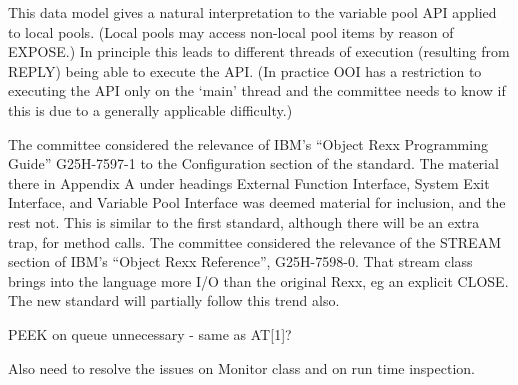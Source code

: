 This data model gives a natural interpretation to the variable pool API
applied to local pools. (Local pools may access non-local pool items by
reason of EXPOSE.) In principle this leads to different threads of
execution (resulting from REPLY) being able to execute the API. (In
practice OOI has a restriction to executing the API only on the `main'
thread and the committee needs to know if this is due to a generally
applicable difficulty.)

The committee considered the relevance of IBM's ``Object Rexx
Programming Guide'' G25H-7597-1 to the Configuration section of the
standard. The material there in Appendix A under headings External
Function Interface, System Exit Interface, and Variable Pool Interface
was deemed material for inclusion, and the rest not. This is similar to
the first standard, although there will be an extra trap, for method
calls. The committee considered the relevance of the STREAM section of
IBM's ``Object Rexx Reference'', G25H-7598-0. That stream class brings
into the language more I/O than the original Rexx, eg an explicit CLOSE.
The new standard will partially follow this trend also.

PEEK on queue unnecessary - same as AT{[}1{]}?

Also need to resolve the issues on Monitor class and on run time
inspection.
